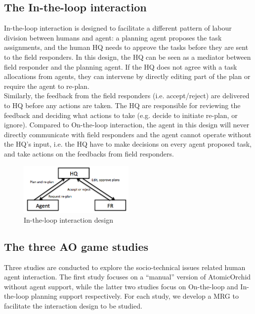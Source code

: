 \subsection{The In-the-loop interaction}
In-the-loop interaction is designed to facilitate a different pattern of labour division between humans and agent: a planning agent proposes the task assignments, and the human HQ needs to approve the tasks before they are sent to the field responders. In this design, the HQ can be seen as a mediator between field responder and the planning agent. If the HQ does not agree with a task allocations from agents, they can intervene by directly editing part of the plan or require the agent to re-plan. \\

Similarly, the feedback from the field responders (i.e. accept/reject) are delivered to HQ before any actions are taken. The HQ are responsible for reviewing the feedback and deciding what actions to take (e.g. decide to initiate re-plan, or ignore). Compared to On-the-loop interaction, the agent in this design will never directly communicate with field responders and the agent cannot operate without the HQ's input, i.e. the HQ have to make decisions on every agent proposed task, and take actions on the feedbacks from field responders. \\

\begin{figure}[h]
  \centering
  \includegraphics[width=0.5\textwidth]{img/approach/InTheLoop}
  \caption{In-the-loop interaction design}
  \label{fig:InTheLoop}
\end{figure}


\subsection{The three AO game studies}
Three studies are conducted to explore the socio-technical issues related human agent interaction. The first study focuses on a ``manual'' version of AtomicOrchid without agent support, while the latter two studies focus on On-the-loop and In-the-loop planning support respectively. For each study, we develop a \acf{MRG} to facilitate the interaction design to be studied. \\ 


